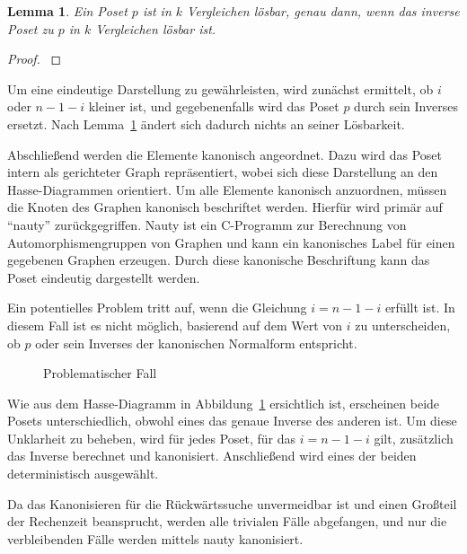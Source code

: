 \documentclass[10pt,journal,compsoc]{IEEEtran}
\newtheorem{lemma}{Lemma}
\begin{document}
\begin{lemma} \label{lemma:inverse_poset}
  Ein Poset $p$ ist in $k$ Vergleichen lösbar, genau dann, wenn das inverse Poset zu $p$ in $k$ Vergleichen lösbar ist.
\end{lemma}

\begin{proof} \label{proof:inverse_poset}
\end{proof}

Um eine eindeutige Darstellung zu gewährleisten, wird zunächst ermittelt, ob $i$ oder $n - 1 - i$ kleiner ist, und gegebenenfalls wird das Poset $p$ durch sein Inverses ersetzt.
Nach Lemma~\ref{lemma:inverse_poset} ändert sich dadurch nichts an seiner Lösbarkeit.

Abschließend werden die Elemente kanonisch angeordnet.
Dazu wird das Poset intern als gerichteter Graph repräsentiert, wobei sich diese Darstellung an den Hasse-Diagrammen orientiert.
Um alle Elemente kanonisch anzuordnen, müssen die Knoten des Graphen kanonisch beschriftet werden.
Hierfür wird primär auf ``nauty'' zurückgegriffen.
Nauty ist ein C-Programm zur Berechnung von Automorphismengruppen von Graphen und kann ein kanonisches Label für einen gegebenen Graphen erzeugen.
Durch diese kanonische Beschriftung kann das Poset eindeutig dargestellt werden.

Ein potentielles Problem tritt auf, wenn die Gleichung $i = n - 1 - i$ erfüllt ist.
In diesem Fall ist es nicht möglich, basierend auf dem Wert von $i$ zu unterscheiden, ob $p$ oder sein Inverses der kanonischen Normalform entspricht.

\begin{figure}
  
  \centering
  \caption{Problematischer Fall}
  \label{fig:backward_canonify_problematic}
\end{figure}

Wie aus dem Hasse-Diagramm in Abbildung~\ref{fig:backward_canonify_problematic} ersichtlich ist, erscheinen beide Posets unterschiedlich, obwohl eines das genaue Inverse des anderen ist.
Um diese Unklarheit zu beheben, wird für jedes Poset, für das $i = n - 1 - i$ gilt, zusätzlich das Inverse berechnet und kanonisiert.
Anschließend wird eines der beiden deterministisch ausgewählt.

Da das Kanonisieren für die Rückwärtssuche unvermeidbar ist und einen Großteil der Rechenzeit beansprucht, werden alle trivialen Fälle abgefangen, und nur die verbleibenden Fälle werden mittels nauty kanonisiert.
\end{document}
